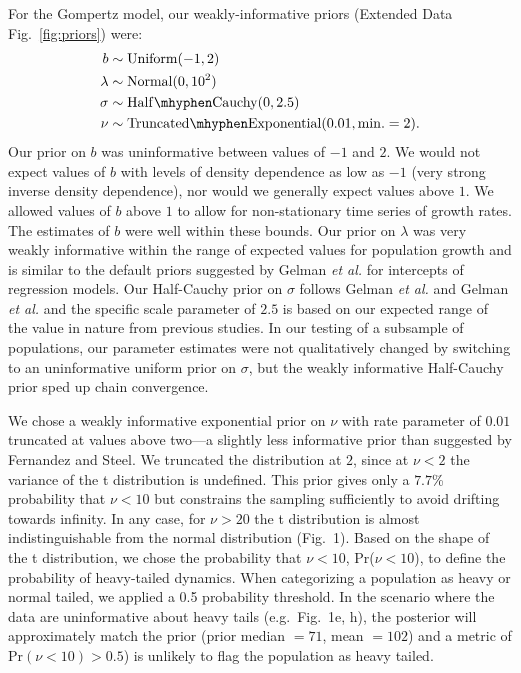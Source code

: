 For the Gompertz model, our weakly-informative priors (Extended Data Fig.~\ref{fig:priors}) were:
\begin{align}
b &\sim \mathrm{Uniform}(-1, 2)\\ \lambda &\sim \mathrm{Normal}(0, 10^2)\\
\sigma &\sim \mathrm{Half\mhyphen Cauchy} (0, 2.5)\\ \nu &\sim
\mathrm{Truncated\mhyphen Exponential}(0.01, \mathrm{min.} = 2).
\end{align}
Our prior on \(b\) was uninformative between values of \(-1\) and \(2\). We would not expect values of \(b\) with levels of density dependence as low as \(-1\) (very strong inverse density dependence), nor would we generally expect values above \(1\). We allowed values of \(b\) above \(1\) to allow for non-stationary time series of growth rates. The estimates of \(b\) were well within these bounds. Our prior on \(\lambda\) was very weakly informative within the range of expected values for population growth and is similar to the default priors suggested by Gelman \emph{et al.}\cite{gelman2008d} for intercepts of regression models. Our Half-Cauchy prior on \(\sigma\) follows Gelman \emph{et al.}\cite{gelman2006c} and Gelman \emph{et al.}\cite{gelman2008d} and the specific scale parameter of \(2.5\) is based on our expected range of the value in nature from previous studies\cite{connors2014}. In our testing of a subsample of populations, our parameter estimates were not qualitatively changed by switching to an uninformative uniform prior on \(\sigma\), but the weakly informative Half-Cauchy prior sped up chain convergence.

We chose a weakly informative exponential prior on \(\nu\) with rate parameter of \(0.01\) truncated at values above two---a slightly less informative prior than suggested by Fernandez and Steel\cite{fernandez1998}. We truncated the distribution at \(2\), since at \(\nu < 2\) the variance of the t distribution is undefined. This prior gives only a \(7.7\)\% probability that \(\nu < 10\) but constrains the sampling sufficiently to avoid drifting towards infinity. In any case, for \(\nu > 20\) the t distribution is almost indistinguishable from the normal distribution (Fig.~1). Based on the shape of the t distribution, we chose the probability that \(\nu < 10\), Pr(\(\nu < 10\)), to define the probability of heavy-tailed dynamics. When categorizing a population as heavy or normal tailed, we applied a 0.5 probability threshold. In the scenario where the data are uninformative about heavy tails (e.g.~Fig.~1e, h), the posterior will approximately match the prior (prior median \(= 71\), mean \(= 102\)) and a metric of Pr\((\nu < 10) > 0.5\)) is unlikely to flag the population as heavy tailed.

